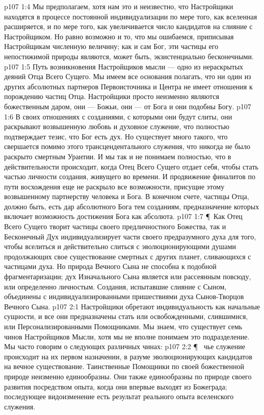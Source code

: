 \vs p107 1:4 Мы предполагаем, хотя нам это и неизвестно, что Настройщики находятся в процессе постоянной индивидуализации по мере того, как вселенная расширяется, и по мере того, как увеличивается число кандидатов на слияние с Настройщиком. Но равно возможно и то, что мы ошибаемся, приписывая Настройщикам численную величину; как и сам Бог, эти частицы его непостижимой природы являются, может быть, экзистенциально бесконечными.
\vs p107 1:5 Путь возникновения Настройщиков мысли --- одно из нераскрытых деяний Отца Всего Сущего. Мы имеем все основания полагать, что ни один из других абсолютных партнеров Первоисточника и Центра не имеет отношения к порождению частиц Отца. Настройщики просто неизменно являются божественным даром, они --- Божьи, они --- от Бога и они подобны Богу.
\vs p107 1:6 В своих отношениях с созданиями, с которыми они будут слиты, они раскрывают возвышенную любовь и духовное служение, что полностью подтверждает тезис, что Бог есть дух. Но существует много такого, что свершается помимо этого трансцендентального служения, что никогда не было раскрыто смертным Урантии. И мы так и не понимаем полностью, что в действительности происходит, когда Отец Всего Сущего отдает себя, чтобы стать частью личности создания, живущего во времени. И продвижение финалитов по пути восхождения еще не раскрыло все возможности, присущие этому возвышенному партнерству человека и Бога. В конечном счете, частицы Отца, должно быть, есть дар абсолютного Бога тем созданиям, предназначение которых включает возможность достижения Бога как абсолюта.
\vs p107 1:7 \P\ Как Отец Всего Сущего творит частицы своего предличностного Божества, так и Бесконечный Дух индивидуализирует части своего предразумного духа для того, чтобы вселиться и действительно слиться с эволюционирующими душами продолжающих свое существование смертных с других планет, сливающихся с частицами духа. Но природа Вечного Сына не способна к подобной фрагментаризации; дух Изначального Сына является или рассеянным повсюду, или определенно личностым. Создания, испытавшие слияние с Сыном, объединены с индивидуализированными пришествиями духа Сынов\hyp{}Творцов Вечного Сына.
\vs p107 2:1 Настройщики обретают индивидуальность как начальные сущности, и все они предназначены стать или освобожденными, слившимися, или Персонализированными Помощниками. Мы знаем, что существует семь чинов Настройщиков Мысли, хотя мы не вполне понимаем это подразделение. Мы часто говорим о следующих различных чинах:
\vs p107 2:2 \P\ \bibnobreakspace {} чье служение происходит на их первом назначении, в разуме эволюционирующих кандидатов на вечное существование. Таинственные Помощники по своей божественной природе неизменно единообразны. Они также единообразны по природе своего развития посредством опыта, когда они впервые выходят из Божеграда; последующее видоизменение есть результат реального опыта вселенского служения.
